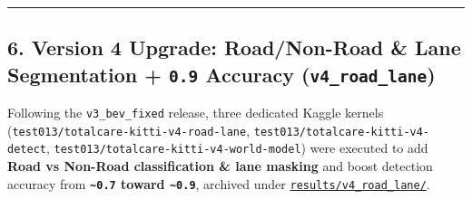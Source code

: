 \documentclass[10.5pt,a4paper]{article}
\begin{document}
\par\noindent\rule{\textwidth}{0.4pt}\par\medskip

\subsection{6. Version 4 Upgrade: Road/Non-Road \& Lane Segmentation + \texttt{0.\allowbreak{}9} Accuracy (\texttt{v4\_\allowbreak{}road\_\allowbreak{}lane})}

Following the \texttt{v3\_\allowbreak{}bev\_\allowbreak{}fixed} release, three dedicated Kaggle kernels (\texttt{test013/\allowbreak{}totalcare-\allowbreak{}kitti-\allowbreak{}v4-\allowbreak{}road-\allowbreak{}lane}, \texttt{test013/\allowbreak{}totalcare-\allowbreak{}kitti-\allowbreak{}v4-\allowbreak{}detect}, \texttt{test013/\allowbreak{}totalcare-\allowbreak{}kitti-\allowbreak{}v4-\allowbreak{}world-\allowbreak{}model}) were executed to add \textbf{Road vs Non-Road classification \& lane masking} and boost detection accuracy from \textbf{\texttt{\textasciitilde{}0.\allowbreak{}7} toward \texttt{\textasciitilde{}0.\allowbreak{}9}}, archived under \href{https://github.com/Heisnotanimposter/Totalcare\_autonomous\_driving\_Yolov5/tree/main/results/v4\_road\_lane/}{\texttt{results/\allowbreak{}v4\_\allowbreak{}road\_\allowbreak{}lane/\allowbreak{}}}.
\end{document}

